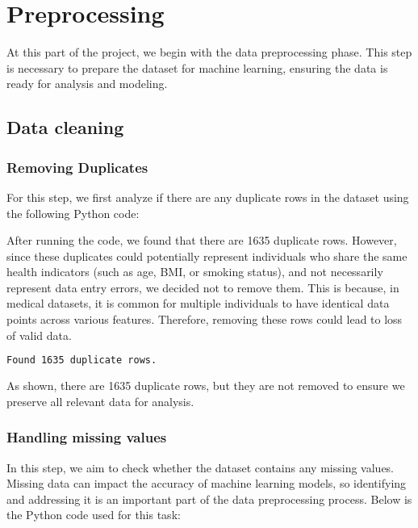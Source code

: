 \section{Preprocessing}

At this part of the project, we begin with the data preprocessing phase. This step is necessary to prepare the dataset for machine learning, ensuring the data is ready for analysis and modeling.

\subsection{Data cleaning}
\subsubsection{Removing Duplicates}
For this step, we first analyze if there are any duplicate rows in the dataset using the following Python code:




After running the code, we found that there are 1635 duplicate rows. However, since these duplicates could potentially represent individuals who share the same health indicators (such as age, BMI, or smoking status), and not necessarily represent data entry errors, we decided not to remove them. This is because, in medical datasets, it is common for multiple individuals to have identical data points across various features. Therefore, removing these rows could lead to loss of valid data.

\begin{lstlisting}[language=bash]
Found 1635 duplicate rows.
\end{lstlisting}

As shown, there are 1635 duplicate rows, but they are not removed to ensure we preserve all relevant data for analysis.

\subsubsection{Handling missing values}

In this step, we aim to check whether the dataset contains any missing values. Missing data can impact the accuracy of machine learning models, so identifying and addressing it is an important part of the data preprocessing process. Below is the Python code used for this task:



